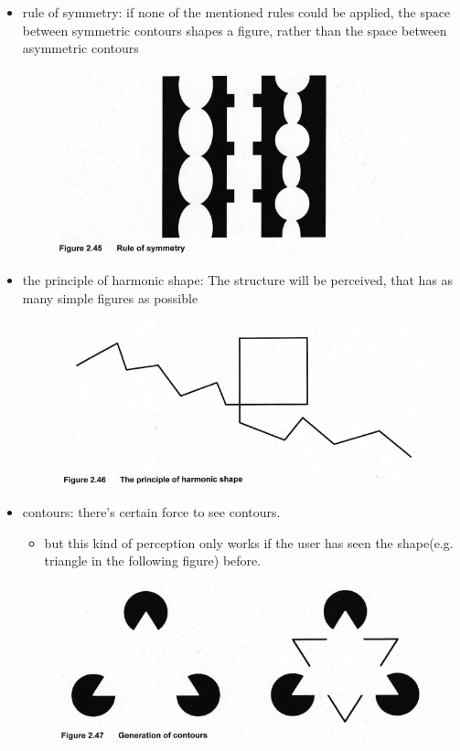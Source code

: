 \documentclass{standalone}
\begin{document}
\begin{itemize}
\begin{itemize}
\begin{figure}[H]
				\end{figure}
		\item rule of symmetry: if none of the mentioned rules could be applied, the space between symmetric contours shapes a figure, rather than the space between asymmetric contours
			\begin{figure}[H]
				\centering
				\includegraphics[width = 0.5\linewidth]{Figures/2_45.png}
			\end{figure}
		\item the principle of harmonic shape: The structure will be perceived, that has as many simple figures as possible
			\begin{figure}[H]
			\centering
			\includegraphics[width = 0.5\linewidth]{Figures/2_46.png}
			\end{figure}
		\item contours: there's certain force to see contours.
			\begin{itemize}
				\item but this kind of perception only works if the user has seen the shape(e.g. triangle in the following figure) before.
			\end{itemize}
			\begin{figure}[H]
			\centering
			\includegraphics[width = 0.7\linewidth]{Figures/2_47.png}
			\end{figure}
	\end{itemize}
\end{itemize}
\end{document}
